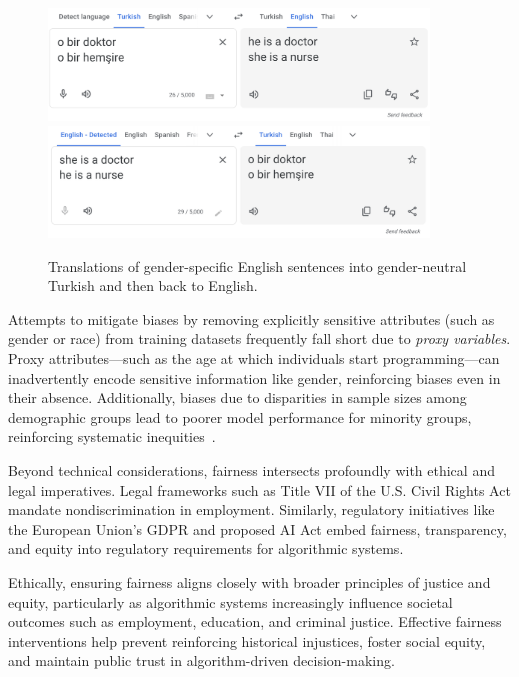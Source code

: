 \begin{figure}[h]
  \centering
  \includegraphics[width=0.9\textwidth]{sections/background/turkish-to-eng.png}
  \includegraphics[width=0.9\textwidth]{sections/background/eng-to-turkish.png}
  \caption{Translations of gender-specific English sentences into
  gender-neutral Turkish and then back to English.}
  \label{fig:eng-to-turkish}
\end{figure}

Attempts to mitigate biases by removing explicitly sensitive
attributes (such as gender or race) from training datasets frequently
fall short due to \textit{proxy variables}. Proxy attributes—such as
the age at which individuals start programming—can inadvertently
encode sensitive information like gender, reinforcing biases even in
their absence. Additionally, biases due to disparities in sample
sizes among demographic groups lead to poorer model performance for
minority groups, reinforcing systematic inequities~\cite{barocas2016big}.

Beyond technical considerations, fairness intersects profoundly with
ethical and legal imperatives. Legal frameworks such as Title VII of
the U.S. Civil Rights Act mandate nondiscrimination in employment.
Similarly, regulatory initiatives like the European Union’s GDPR and
proposed AI Act embed fairness, transparency, and equity into
regulatory requirements for algorithmic systems.

Ethically, ensuring fairness aligns closely with broader principles
of justice and equity, particularly as algorithmic systems
increasingly influence societal outcomes such as employment,
education, and criminal justice. Effective fairness interventions
help prevent reinforcing historical injustices, foster social equity,
and maintain public trust in algorithm-driven decision-making.


